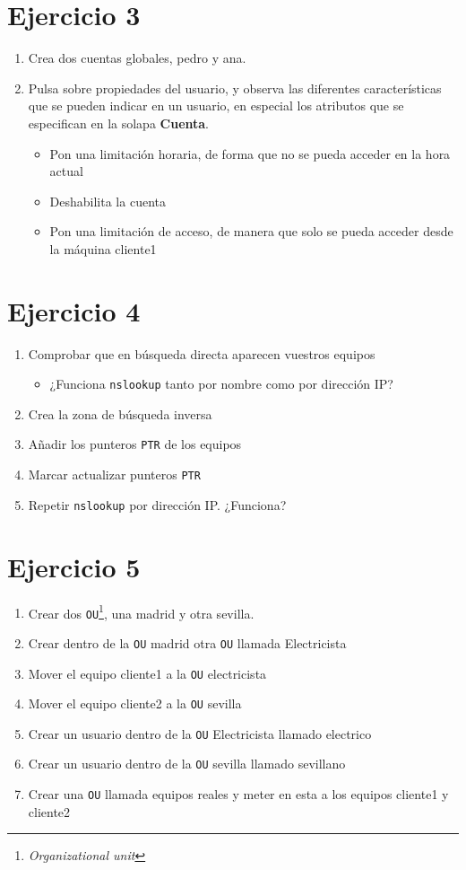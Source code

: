 \documentclass[11pt]{article}
\begin{document}
\section{Ejercicio 3}
\label{sec:orgdc92c6a}
\begin{enumerate}
\item Crea dos cuentas globales, pedro y ana.
\item Pulsa sobre propiedades del usuario, y observa las diferentes características que se pueden indicar en un usuario, en especial los atributos que se especifican en la solapa \textbf{Cuenta}.
\begin{itemize}
\item Pon una limitación horaria, de forma que no se pueda acceder en la hora actual
\item Deshabilita la cuenta
\item Pon una limitación de acceso, de manera que solo se pueda acceder desde la máquina cliente1
\end{itemize}
\end{enumerate}


\section{Ejercicio 4}
\label{sec:org0368d18}
\begin{enumerate}
\item Comprobar que en búsqueda directa aparecen vuestros equipos
\begin{itemize}
\item ¿Funciona \texttt{nslookup} tanto por nombre como por dirección IP?
\end{itemize}
\item Crea la zona de búsqueda inversa
\item Añadir los punteros \texttt{PTR} de los equipos
\item Marcar actualizar punteros \texttt{PTR}
\item Repetir \texttt{nslookup} por dirección IP. ¿Funciona?
\end{enumerate}


\section{Ejercicio 5}
\label{sec:orgc37d98c}
\begin{enumerate}
\item Crear dos \texttt{OU}\footnote{\emph{Organizational unit}}, una madrid y otra sevilla.
\item Crear dentro de la \texttt{OU} madrid otra \texttt{OU} llamada Electricista
\item Mover el equipo cliente1 a la \texttt{OU} electricista
\item Mover el equipo cliente2 a la \texttt{OU} sevilla
\item Crear un usuario dentro de la \texttt{OU} Electricista llamado electrico
\item Crear un usuario dentro de la \texttt{OU} sevilla llamado sevillano
\item Crear una \texttt{OU} llamada equipos reales y meter en esta a los equipos cliente1 y cliente2
\end{enumerate}
\end{document}
